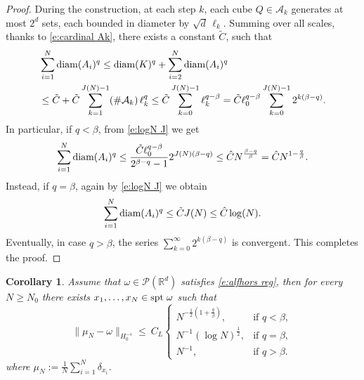 \documentclass[12pt,a4paper,oneside]{amsart}
\theoremstyle{plain}
\newtheorem{corollary}[theorem]{Corollary}
\theoremstyle{definition}
\numberwithin{equation}{section}
\numberwithin{figure}{section}
\numberwithin{table}{section}
\theoremstyle{remark}
\newcommand{\R}{\mathbb{R}}
\newcommand{\expAhlfors}{\beta}
\begin{document}
\begin{proof}
During the construction, at each step $k$, each cube $Q \in \mathcal{A}_k$ generates at most $2^d$ sets, each bounded in diameter by $\sqrt{d}\,\ell_k$. Summing over all scales, thanks to \eqref{e:cardinal Ak}, there exists a constant $\tilde C$, such that
\begin{align*}
& \sum_{i=1}^N \textup{diam}(A_i)^q\leq \textup{diam}(K)^q+ \sum_{i=2}^N \textup{diam}(A_i)^q \\ & \le \tilde C+ \tilde C \sum_{k=1}^{J(N)-1} (\#\mathcal{A}_k)\,\ell_k^q \le \tilde C \sum_{k=0}^{J(N)-1} \ell_k^{q-\expAhlfors}=  \tilde C\ell_0^{q-\expAhlfors} \sum_{k=0}^{J(N)-1} 2^{k(\expAhlfors-q)}.    
\end{align*}
In particular, if $q < \expAhlfors$, from \eqref{e:logN J} we get
\begin{equation*}
  \sum_{i=1}^N \textup{diam}(A_i)^q\leq \frac{\tilde C\ell_0^{q-\expAhlfors}}{2^{\expAhlfors-q}-1}2^{J(N)(\expAhlfors-q)}\leq  \hat C N^{\frac{\expAhlfors-q}{\expAhlfors}}=\hat C N^{1-\frac{q}{\expAhlfors}}.   
\end{equation*}
Instead, if $q = \expAhlfors$, again by \eqref{e:logN J} we obtain
\begin{equation*}
  \sum_{i=1}^N \textup{diam}(A_i)^q\leq \tilde C J(N)\leq  \hat C \log(N).
\end{equation*}
Eventually, in case $q > \expAhlfors$, the series $\sum_{k=0}^{\infty} 2^{k(\expAhlfors-q)}$ is convergent. This completes the proof.
\end{proof}

\begin{corollary}\label{c:upper senza connesso}
Assume that $\omega\in \mathcal{P}(\R^d)$ satisfies \eqref{e:alfhors reg}, then for every $N\geq N_0$ there exists $x_1,\dots,x_N \in \textup{spt} \; \omega$ such that 
\begin{equation}\label{e:upper-bound-non connesso}
\|\mu_N-\omega\|_{H_0^{-s}}\le\ C_L 
\begin{cases} 
    N^{-\frac12(1+\frac{q}{\expAhlfors})}, & \text{if } q < \expAhlfors,\\[2mm] 
    N^{-1}(\log N)^{\frac12}, & \text{if } q = \expAhlfors,\\[2mm] 
    N^{-1}, & \text{if } q > \expAhlfors. 
    \end{cases}
\end{equation}
where ${\mu_N}:=\frac1N\sum_{i=1}^N \delta_{x_i}$. 
\end{corollary}
\end{document}
